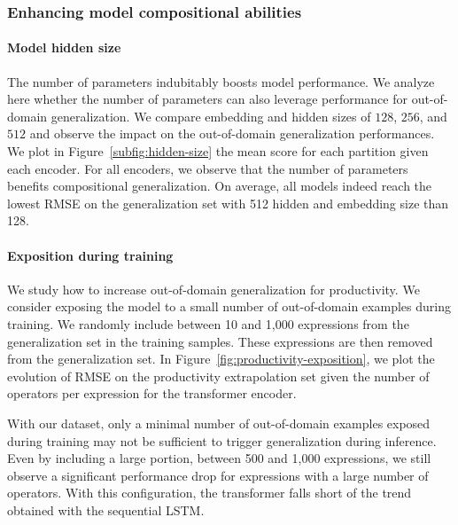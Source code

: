 \subsubsection{Enhancing model compositional abilities}

\paragraph{Model hidden size} The number of parameters indubitably boosts model performance. We analyze here whether the number of parameters can also leverage performance for out-of-domain generalization. We compare embedding and hidden sizes of $128$, $256$, and $512$ and observe the impact on the out-of-domain generalization performances. We plot in Figure~\ref{subfig:hidden-size} the mean score for each partition given each encoder. For all encoders, we observe that the number of parameters benefits compositional generalization. On average, all models indeed reach the lowest RMSE on the generalization set with 512 hidden and embedding size than 128.

\paragraph{Exposition during training} We study how to increase out-of-domain generalization for productivity. We consider exposing the model to a small number of out-of-domain examples during training. We randomly include between 10 and 1,000 expressions from the generalization set in the training samples. These expressions are then removed from the generalization set. In Figure~\ref{fig:productivity-exposition}, we plot the evolution of RMSE on the productivity extrapolation set given the number of operators per expression for the transformer encoder. 

With our dataset, only a minimal number of out-of-domain examples exposed during training may not be sufficient to trigger generalization during inference. Even by including a large portion, between 500 and 1,000 expressions, we still observe a significant performance drop for expressions with a large number of operators. With this configuration, the transformer falls short of the trend obtained with the sequential LSTM.


